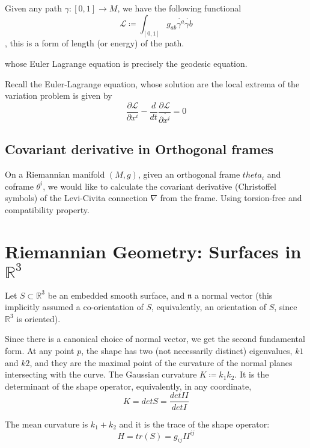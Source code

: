 \documentclass[main.tex]{subfiles}
\begin{document}
Given any path $\gamma: [0,1] \rightarrow M$, we have the following functional 
$$
\mathcal{L} \coloneqq \int_{[0,1]} g_{ab} \dot{\gamma^a} \dot{\gamma b}
$$, this is a form of length (or energy) of the path.

whose Euler Lagrange equation is precisely the geodesic equation. 

Recall the Euler-Lagrange equation, whose solution are the local extrema of the variation problem is given by 
$$
\frac{\partial \mathcal{L}}{\partial x^i} - \frac{d}{dt} \frac{\partial \mathcal{L}}{\partial \dot{x^i}} = 0
$$

\subsection{Covariant derivative in Orthogonal frames}

On a Riemannian manifold $(M, g)$, given an orthogonal frame $theta_i$ and coframe $\theta^i$, we would like to calculate the covariant derivative (Christoffel symbols) of the Levi-Civita connection $\nabla$ from the frame. Using torsion-free and compatibility property.




\section{Riemannian Geometry: Surfaces in $\mathbb{R}^3$}

Let $S \subset \mathbb{R}^3$ be an embedded smooth surface, and $\mathfrak{n}$ a normal vector (this implicitly assumed a co-orientation of $S$, equivalently, an orientation of $S$, since $\mathbb{R}^3$ is oriented).

Since there is a canonical choice of normal vector, we get the second fundamental form. At any point $p$, the shape has two (not necessarily distinct) eigenvalues, $k1$ and $k2$, and they are the maximal point of the curvature of the normal planes intersecting with the curve. The Gaussian curvature $K \coloneqq k_1 k_2$. It is the determinant of the shape operator, equivalently, in any coordinate, 
$$
K = det S = \frac{det II}{det I}
$$

The mean curvature is $k_1 + k_2$ and it is the trace of the shape operator:
$$
H = tr(S) = g_{ij} II^{ij}
$$
\end{document}
